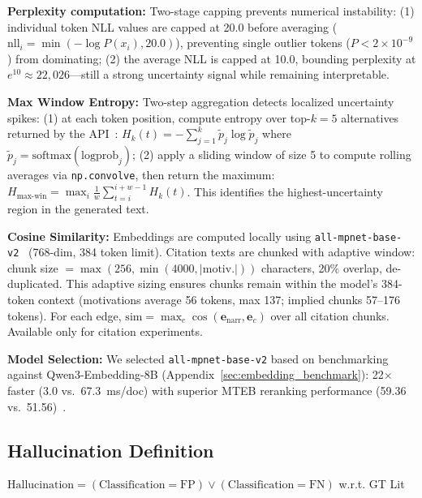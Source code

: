 \textbf{Perplexity computation:} Two-stage capping prevents numerical instability: (1) individual token NLL values are capped at 20.0 before averaging ($\text{nll}_i = \min(-\log P(x_i), 20.0)$), preventing single outlier tokens ($P < 2 \times 10^{-9}$) from dominating; (2) the average NLL is capped at 10.0, bounding perplexity at $e^{10} \approx 22{,}026$---still a strong uncertainty signal while remaining interpretable.

\textbf{Max Window Entropy:} Two-step aggregation detects localized uncertainty spikes: (1) at each token position, compute entropy over top-$k=5$ alternatives returned by the API~\cite{openai2024api}: $H_k(t) = -\sum_{j=1}^{k} \tilde{p}_j \log \tilde{p}_j$ where $\tilde{p}_j = \text{softmax}(\text{logprob}_j)$; (2) apply a sliding window of size 5 to compute rolling averages via \texttt{np.convolve}, then return the maximum: $H_{\text{max-win}} = \max_i \frac{1}{w}\sum_{t=i}^{i+w-1} H_k(t)$. This identifies the highest-uncertainty region in the generated text.

\textbf{Cosine Similarity:} Embeddings are computed locally using \texttt{all-mpnet-base-v2}~\cite{reimers2019sentencebert} (768-dim, 384 token limit). Citation texts are chunked with adaptive window: chunk size $= \max(256, \min(4000, |\text{motiv.}|))$ characters, 20\% overlap, de-duplicated. This adaptive sizing ensures chunks remain within the model's 384-token context (motivations average 56 tokens, max 137; implied chunks 57--176 tokens). For each edge, $\text{sim} = \max_c \cos(\mathbf{e}_{\text{narr}}, \mathbf{e}_c)$ over all citation chunks. Available only for citation experiments.

\textbf{Model Selection:} We selected \texttt{all-mpnet-base-v2} based on benchmarking against Qwen3-Embedding-8B (Appendix~\ref{sec:embedding_benchmark}): 22$\times$ faster (3.0 vs.\ 67.3~ms/doc) with superior MTEB reranking performance (59.36 vs.\ 51.56)~\cite{muennighoff2023mteb}.

\subsection{Hallucination Definition}
$\text{Hallucination} = (\text{Classification} = \text{FP}) \lor (\text{Classification} = \text{FN})$ w.r.t. GT Lit

